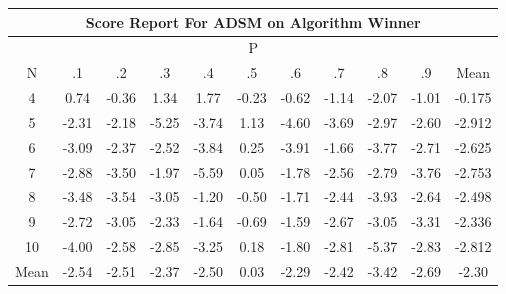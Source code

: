 \documentclass[11pt,a4paper]{report}
\begin{document}
\begin{longtable}{ | c || c | c | c | c | c | c | c | c | c || c |}
\hline
\multicolumn{11}{|c|}{ Score Report For ADSM on Algorithm Winner} \\
\hline
\multicolumn{11}{|c|}{ P } \\
\hline
N & .1 & .2 & .3 & .4 & .5 & .6 & .7 & .8 & .9 & Mean\\
 \hline
 \hline
 \endhead
  4 &  \cellcolor[HTML]{EFEFFF} 0.74 &  \cellcolor[HTML]{FFF7F7} -0.36 &  \cellcolor[HTML]{DFDFFF} 1.34 &  \cellcolor[HTML]{CFCFFF} 1.77 &  \cellcolor[HTML]{FFF7F7} -0.23 &  \cellcolor[HTML]{FFEFEF} -0.62 &  \cellcolor[HTML]{FFDFDF} -1.14 &  \cellcolor[HTML]{FFC7C7} -2.07 &  \cellcolor[HTML]{FFE7E7} -1.01 & -0.175 \\
  5 &  \cellcolor[HTML]{FFC7C7} -2.31 &  \cellcolor[HTML]{FFC7C7} -2.18 &  \cellcolor[HTML]{FF7878} -5.25 &  \cellcolor[HTML]{FF9F9F} -3.74 &  \cellcolor[HTML]{DFDFFF} 1.13 &  \cellcolor[HTML]{FF8F8F} -4.60 &  \cellcolor[HTML]{FF9F9F} -3.69 &  \cellcolor[HTML]{FFB7B7} -2.97 &  \cellcolor[HTML]{FFBFBF} -2.60 & -2.912 \\
  6 &  \cellcolor[HTML]{FFAFAF} -3.09 &  \cellcolor[HTML]{FFC7C7} -2.37 &  \cellcolor[HTML]{FFBFBF} -2.52 &  \cellcolor[HTML]{FF9F9F} -3.84 &  \cellcolor[HTML]{F7F7FF} 0.25 &  \cellcolor[HTML]{FF9F9F} -3.91 &  \cellcolor[HTML]{FFD7D7} -1.66 &  \cellcolor[HTML]{FF9F9F} -3.77 &  \cellcolor[HTML]{FFB7B7} -2.71 & -2.625 \\
  7 &  \cellcolor[HTML]{FFB7B7} -2.88 &  \cellcolor[HTML]{FFA7A7} -3.50 &  \cellcolor[HTML]{FFCFCF} -1.97 &  \cellcolor[HTML]{FF7070} -5.59 &  \cellcolor[HTML]{FFFFFF} 0.05 &  \cellcolor[HTML]{FFCFCF} -1.78 &  \cellcolor[HTML]{FFBFBF} -2.56 &  \cellcolor[HTML]{FFB7B7} -2.79 &  \cellcolor[HTML]{FF9F9F} -3.76 & -2.753 \\
  8 &  \cellcolor[HTML]{FFA7A7} -3.48 &  \cellcolor[HTML]{FFA7A7} -3.54 &  \cellcolor[HTML]{FFAFAF} -3.05 &  \cellcolor[HTML]{FFDFDF} -1.20 &  \cellcolor[HTML]{FFEFEF} -0.50 &  \cellcolor[HTML]{FFD7D7} -1.71 &  \cellcolor[HTML]{FFBFBF} -2.44 &  \cellcolor[HTML]{FF9F9F} -3.93 &  \cellcolor[HTML]{FFBFBF} -2.64 & -2.498 \\
  9 &  \cellcolor[HTML]{FFB7B7} -2.72 &  \cellcolor[HTML]{FFAFAF} -3.05 &  \cellcolor[HTML]{FFC7C7} -2.33 &  \cellcolor[HTML]{FFD7D7} -1.64 &  \cellcolor[HTML]{FFEFEF} -0.69 &  \cellcolor[HTML]{FFD7D7} -1.59 &  \cellcolor[HTML]{FFBFBF} -2.67 &  \cellcolor[HTML]{FFAFAF} -3.05 &  \cellcolor[HTML]{FFAFAF} -3.31 & -2.336 \\
  10 &  \cellcolor[HTML]{FF9797} -4.00 &  \cellcolor[HTML]{FFBFBF} -2.58 &  \cellcolor[HTML]{FFB7B7} -2.85 &  \cellcolor[HTML]{FFAFAF} -3.25 &  \cellcolor[HTML]{F7F7FF} 0.18 &  \cellcolor[HTML]{FFCFCF} -1.80 &  \cellcolor[HTML]{FFB7B7} -2.81 &  \cellcolor[HTML]{FF7878} -5.37 &  \cellcolor[HTML]{FFB7B7} -2.83 & -2.812 \\
 \hline
 \hline
Mean &  \cellcolor[HTML]{FFBFBF} -2.54 &  \cellcolor[HTML]{FFBFBF} -2.51 &  \cellcolor[HTML]{FFC7C7} -2.37 &  \cellcolor[HTML]{FFBFBF} -2.50 &  \cellcolor[HTML]{FFFFFF} 0.03 &  \cellcolor[HTML]{FFC7C7} -2.29 &  \cellcolor[HTML]{FFBFBF} -2.42 &  \cellcolor[HTML]{FFA7A7} -3.42 &  \cellcolor[HTML]{FFBFBF} -2.69 &  \cellcolor[HTML]{FFC7C7} -2.30
\end{longtable}
\end{document}
